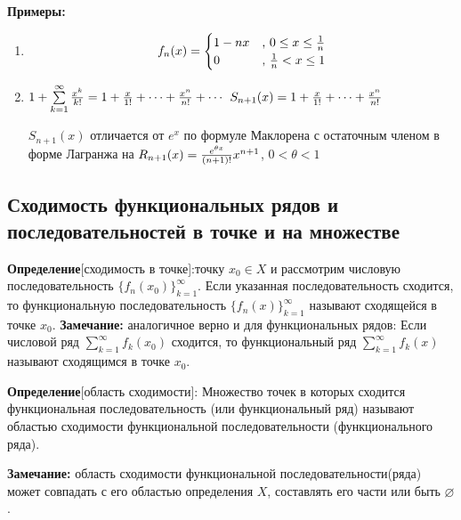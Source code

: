 \documentclass[a4paper,12pt]{article} %
\begin{document}
\noindent \textbf{Примеры:}
\begin{enumerate}
    
    \item 
\begin{equation*}
f_n(x) = 
 \begin{cases}
   1-nx &\text{, $0 \leq x \leq {1 \over n}$}\\
   0 &\text{, ${1\over n}< x\leq 1$}
 \end{cases}
\end{equation*}

    \item
    $1 + \sum\limits_{k=1}^\infty {x^k \over k!}  = 1 + {x\over 1!} + \cdots + {x^n \over n!} + \cdots$ \newline
    $S_{n+1}(x) = 1 + {x\over 1!} + \cdots + {x^n \over n!}$ \newline
    
    $S_{n+1}(x)$ отличается от $e^x$ по формуле Маклорена с остаточным членом в форме Лагранжа на $R_{n+1}(x)= {e^{\theta x}\over {(n+1)!}} x^{n+1}$,  $0 < \theta < 1$
\end{enumerate}

\subsection*{Сходимость функциональных рядов и последовательностей в точке и на множестве }

\noindent \textbf{Определение}[сходимость в точке]: точку $x_0 \in X$ и рассмотрим числовую последовательность $\{f_n(x_0)\}_{k=1}^\infty$. Если указанная последовательность сходится, то функциональную последовательность $\{f_n(x)\}_{k=1}^\infty$ называют сходящейся в точке $x_0$. \newline \newline
\noindent \textbf{Замечание:} аналогичное верно и для функциональных рядов: Если числовой ряд $\sum\limits_{k = 1}^{\infty}  f_k(x_0)$ сходится, то функциональный ряд  $\sum\limits_{k = 1}^{\infty}  f_k(x)$ называют сходящимся в точке $x_0$. \newline

\noindent \textbf{Определение}[область сходимости]:\newline
Множество точек в которых сходится функциональная последовательность (или функциональный ряд) называют областью сходимости функциональной последовательности (функционального ряда). \newline 

\noindent \textbf{Замечание:} область сходимости функциональной последовательности(ряда) может совпадать с его областью определения $X$, составлять его части или быть $\varnothing$. \newline
\end{document}
